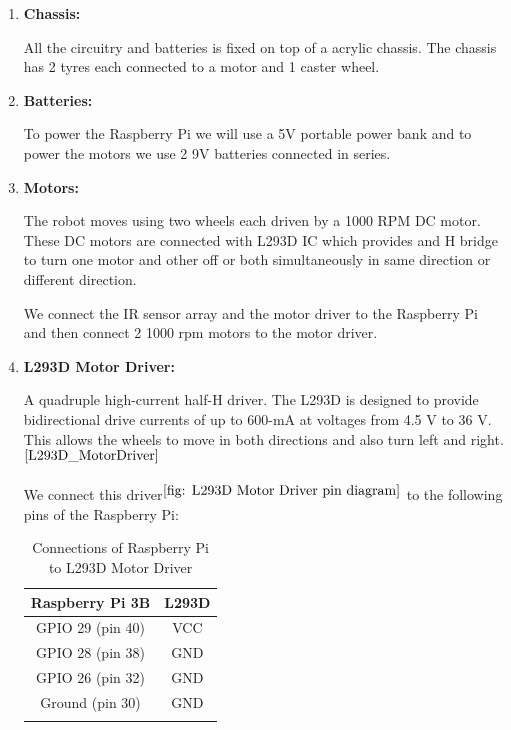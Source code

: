 \begin{enumerate}[topsep=-2pt, itemsep=6mm]
			
		
		
		
		
		\item \textbf{Chassis:} 
		
		All the circuitry and batteries is fixed on top of a acrylic chassis. The chassis has 2 tyres each connected to a motor and 1 caster wheel.
		
		\item \textbf{Batteries:} 
		
		To power the Raspberry Pi we will use a 5V portable power bank and to power the motors we use 2 9V batteries connected in series. 
				
		
		\item \textbf{Motors:} 
		
			The robot moves using two wheels each driven by a 1000 RPM DC motor. These DC motors are connected with L293D IC which provides and H bridge to turn one motor and other off or both simultaneously in same direction or different direction. 
			
			We connect the IR sensor array and the motor driver to the Raspberry Pi and then connect 2 1000 rpm motors to the motor driver.  
		
		
		\item \textbf{L293D Motor Driver:} 
		
			A quadruple high-current half-H driver. The L293D is designed to provide bidirectional drive currents of up to 600-mA at voltages from 4.5 V to 36 V. This allows the wheels to move in both directions and also turn left and right. ${}^{\cite{L293D_MotorDriver}}$
		
		
			We connect this driver${}^{\ref{fig: L293D Motor Driver pin diagram}}$ to the following pins of the Raspberry Pi:
	
			\tabulinesep=6pt	%
			\begin{longtabu} to \textwidth {| c | c | } \hline
				\centering 
				Raspberry Pi 3B & L293D \\ \hline
				GPIO 29 (pin 40) & VCC \\ 
				GPIO 28 (pin 38) & GND \\ 
				GPIO 26 (pin 32) & GND \\ 
				Ground (pin 30) & GND \\ \hline
				\caption{Connections of Raspberry Pi to L293D Motor Driver}
			\end{longtabu}
			

\end{enumerate}
